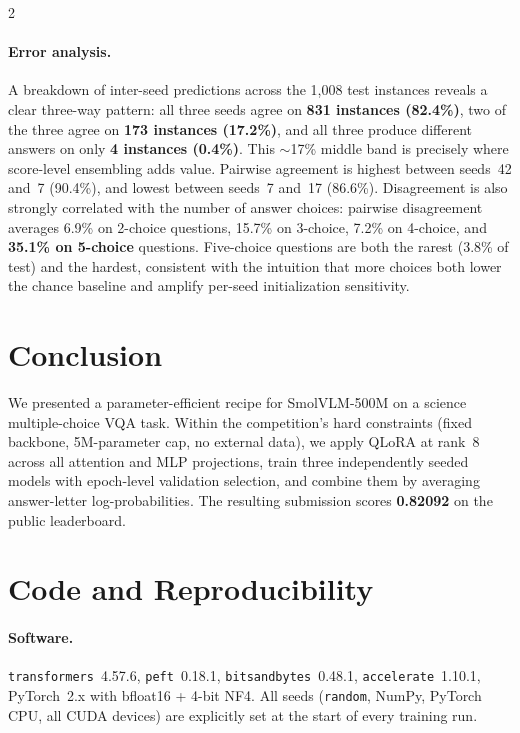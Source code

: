 \documentclass[11pt,a4paper]{article}
\begin{document}
\begin{multicols}{2}
\paragraph{Error analysis.} A breakdown of inter-seed predictions across the 1{,}008 test instances reveals a clear three-way pattern: all three seeds agree on \textbf{831 instances (82.4\%)}, two of the three agree on \textbf{173 instances (17.2\%)}, and all three produce different answers on only \textbf{4 instances (0.4\%)}. This $\sim$17\% middle band is precisely where score-level ensembling adds value. Pairwise agreement is highest between seeds~42 and~7 (90.4\%), and lowest between seeds~7 and~17 (86.6\%). Disagreement is also strongly correlated with the number of answer choices: pairwise disagreement averages 6.9\% on 2-choice questions, 15.7\% on 3-choice, 7.2\% on 4-choice, and \textbf{35.1\% on 5-choice} questions. Five-choice questions are both the rarest (3.8\% of test) and the hardest, consistent with the intuition that more choices both lower the chance baseline and amplify per-seed initialization sensitivity.

\section{Conclusion}

We presented a parameter-efficient recipe for SmolVLM-500M on a science multiple-choice VQA task. Within the competition's hard constraints (fixed backbone, 5M-parameter cap, no external data), we apply QLoRA at rank~8 across all attention and MLP projections, train three independently seeded models with epoch-level validation selection, and combine them by averaging answer-letter log-probabilities. The resulting submission scores \textbf{0.82092} on the public leaderboard.

\section{Code and Reproducibility}

\paragraph{Software.} \texttt{transformers}~4.57.6, \texttt{peft}~0.18.1, \texttt{bitsandbytes}~0.48.1, \texttt{accelerate}~1.10.1, PyTorch~2.x with bfloat16 + 4-bit NF4. All seeds (\texttt{random}, NumPy, PyTorch CPU, all CUDA devices) are explicitly set at the start of every training run.


\end{multicols}
\end{document}
